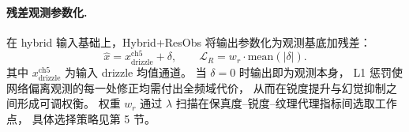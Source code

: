 \paragraph{残差观测参数化.}
在 hybrid 输入基础上，Hybrid+ResObs 将输出参数化为观测基底加残差：
\begin{equation}
  \hat{x} = x_{\mathrm{drizzle}}^{\mathrm{ch5}} + \delta, \qquad
  \mathcal{L}_R = w_r \cdot \mathrm{mean}(|\delta|).
\end{equation}
其中 \(x_{\mathrm{drizzle}}^{\mathrm{ch5}}\) 为输入 drizzle 均值通道。
当 \(\delta = 0\) 时输出即为观测本身，
L1 惩罚使网络偏离观测的每一处修正均需付出全频域代价，
从而在锐度提升与幻觉抑制之间形成可调权衡。
权重 \(w_r\) 通过 \(\lambda\) 扫描在保真度--锐度--纹理代理指标间选取工作点，
具体选择策略见第 5 节。


